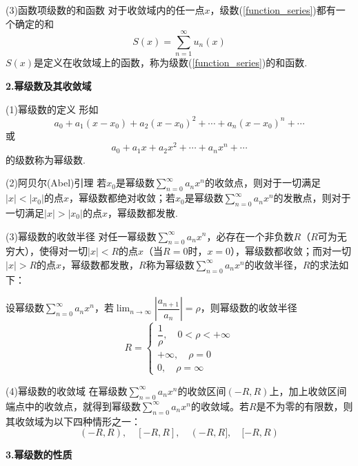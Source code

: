 (3)函数项级数的和函数 \quad 对于收敛域内的任一点$x$，级数(\ref{function_series})都有一个确定的和
\begin{equation*}
    S(x)=\sum_{n=1}^\infty u_n(x)
\end{equation*}
$S(x)$是定义在收敛域上的函数，称为级数(\ref{function_series})的和函数.

\textbf{2.幂级数及其收敛域}

(1)幂级数的定义 \quad 形如
\begin{equation*}
    a_0+a_1(x-x_0)+a_2(x-x_0)^2+\cdots+a_n(x-x_0)^n+\cdots
\end{equation*}
或
\begin{equation*}
    a_0+a_1x+a_2x^2+\cdots+a_nx^n+\cdots
\end{equation*}
的级数称为幂级数.

(2)阿贝尔(Abel)引理 \quad 若$x_0$是幂级数$\displaystyle\sum_{n=0}^\infty a_n x^n$的收敛点，则对于一切满足$|x|<|x_0|$的点$x$，幂级数都绝对收敛；若$x_0$是幂级数$\displaystyle\sum_{n=0}^\infty a_n x^n$的发散点，则对于一切满足$|x|>|x_0|$的点$x$，幂级数都发散.

(3)幂级数的收敛半径 \quad 对任一幂级数$\displaystyle\sum_{n=0}^\infty a_n x^n$，必存在一个非负数$R$（$R$可为无穷大），使得对一切$|x|<R$的点$x$（当$R=0$时，$x=0$），幂级数都收敛；而对一切$|x|>R$的点$x$，幂级数都发散，$R$称为幂级数$\displaystyle\sum_{n=0}^\infty a_n x^n$的收敛半径，$R$的求法如下：

设幂级数$\displaystyle\sum_{n=0}^\infty a_n x^n$，若$\displaystyle\lim_{n\rightarrow\infty}\left|\dfrac{a_{n+1}}{a_n}\right|=\rho$，则幂级数的收敛半径
\begin{equation*}
    R=\begin{cases}
        \dfrac{1}{\rho}, \quad 0<\rho<+\infty\\
        +\infty, \quad \rho=0\\
        0, \quad \rho=\infty
    \end{cases}
\end{equation*}

(4)幂级数的收敛域 \quad 在幂级数$\displaystyle\sum_{n=0}^\infty a_n x^n$的收敛区间$(-R,R)$上，加上收敛区间端点中的收敛点，就得到幂级数$\displaystyle\sum_{n=0}^\infty a_n x^n$的收敛域。若$R$是不为零的有限数，则其收敛域为以下四种情形之一：
\begin{equation*}
    (-R,R), \quad [-R,R], \quad (-R,R], \quad [-R,R)
\end{equation*}

\textbf{3.幂级数的性质}

